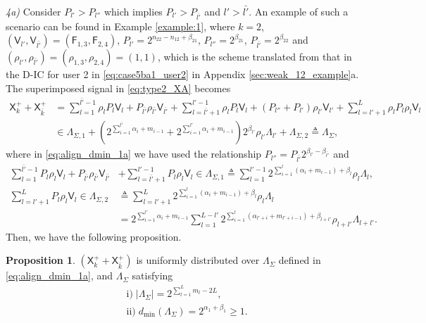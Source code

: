 \documentclass[12pt, draftclsnofoot, onecolumn]{IEEEtran}
\newcommand{\msf}[1]{\mathsf{#1}}
\theoremstyle{definition}
\newtheorem{proposition}{Proposition}
\begin{document}
\emph{4a)} Consider $P_{l'}>P_{l''}$ which implies $P_{l'}>P_{\bar{l'}}$ and $l'>\bar{l'}$. An example of such a scenario can be found in Example \ref{example:1}, where $k=2$, $(\msf{V}_{l'},\msf{V}_{\bar{l'}}) = (\msf{F}_{1,3},\msf{F}_{2,4})$, $P_{l'} = 2^{n_{22}-n_{12}+\beta_{21}}$, $P_{l''} = 2^{\beta_{21}}$, $P_{\bar{l'}} = 2^{\beta_{22}}$ and $(\rho_{l'},\rho_{\bar{l'}})=(\rho_{1,3},\rho_{2,4})=(1,1)$, which is the scheme translated from that in the D-IC for user 2 in \eqref{eq:case5ba1_user2} in Appendix \ref{sec:weak_12_example}a. The superimposed signal in \eqref{eq:type2_XA} becomes
\begin{align}
\msf{X}^{+}_k+\msf{X}^{+}_{\bar{k}}&= \sum_{l=1}^{\bar{l'}-1}\rho_{l}P_l\msf{V}_l+P_{\bar{l'}}\rho_{\bar{l'}}\msf{V}_{\bar{l'}}+\sum_{l=\bar{l'}+1}^{l'-1}\rho_{l}P_l\msf{V}_l + (P_{l''}+P_{l'})\rho_{l'}\msf{V}_{l'}+\sum_{l=l'+1}^L\rho_{l}P_l\rho_l\msf{V}_l  \\
&\in \Lambda_{\Sigma,1}
+ (2^{\sum_{i=1}^{\bar{l'}}\alpha_i+m_{i-1}}+2^{\sum_{i=1}^{l'}\alpha_i+m_{i-1}})2^{\beta_{l'}}\rho_{l'}\Lambda_{l'} %
+ \Lambda_{\Sigma,2}\triangleq \Lambda_{\Sigma}, \label{eq:align_dmin_1a}
\end{align}
where in \eqref{eq:align_dmin_1a} we have used the relationship $P_{l''}=P_{\bar{l'}}2^{\beta_{l'}-\beta_{\bar{l'}}}$ and
\begin{align}
\sum_{l=1}^{\bar{l'}-1}P_l\rho_l\msf{V}_l+P_{\bar{l'}}\rho_{\bar{l'}}\msf{V}_{\bar{l'}}&+\sum_{l=\bar{l'}+1}^{l'-1}P_l\rho_{l}\msf{V}_l \in \Lambda_{\Sigma,1} \triangleq \sum_{l=1}^{l'-1} 2^{\sum_{i=1}^l(\alpha_i+m_{i-1})+\beta_l}\rho_l\Lambda_l,\label{lambda_1} \\
\sum_{l=l'+1}^LP_l\rho_l\msf{V}_l\in\Lambda_{\Sigma,2} &\triangleq \sum_{l=l'+1}^{L} 2^{\sum_{i=1}^l(\alpha_i+m_{i-1})+\beta_l}\rho_l\Lambda_l  \nonumber \\
&= 2^{\sum_{i=1}^{l'}\alpha_i+m_{i-1}}\sum_{l=1}^{L-l'} 2^{\sum_{i=1}^l(\alpha_{l'+i}+m_{l'+i-1})+\beta_{l+l'}}\rho_{l+l'}\Lambda_{l+l'}. \label{lambda_3}
\end{align}
Then, we have the following proposition.
\begin{proposition}\label{prop:type2dmin1}
$(\msf{X}^{+}_k+\msf{X}^{+}_{\bar{k}})$ is uniformly distributed over $\Lambda_{\Sigma}$ defined in \eqref{eq:align_dmin_1a}, and $\Lambda_{\Sigma}$ satisfying
\begin{align}
&\text{i)}\;|\Lambda_{\Sigma}| =  2^{\sum_{l=1}^Lm_l-2L}, \nonumber \\
&\text{ii)}\;d_{\min}(\Lambda_{\Sigma}) =  2^{\alpha_1+\beta_1} \geq 1. \nonumber
\end{align}
\end{proposition}
\end{document}
